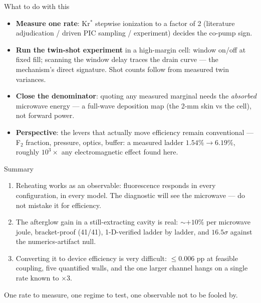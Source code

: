 \documentclass[aspectratio=169,10pt]{beamer}
\newcommand{\good}[1]{\textcolor{okgreen}{#1}}
\newcommand{\bad}[1]{\textcolor{badred}{#1}}
\begin{document}
\begin{frame}{What to do with this}
\begin{itemize}
  \item \textbf{Measure one rate}: Kr$^*$ stepwise ionization to a
        factor of 2 (literature adjudication / driven PIC sampling /
        experiment) decides the co-pump sign.
  \item \textbf{Run the twin-shot experiment} in a high-margin cell:
        window on/off at fixed fill; scanning the window delay traces
        the drain curve --- the mechanism's direct signature. Shot
        counts follow from measured twin variances.
  \item \textbf{Close the denominator}: quoting any measured marginal
        needs the \emph{absorbed} microwave energy --- a full-wave
        deposition map (the 2-mm skin vs the cell), not forward power.
  \item \textbf{Perspective}: the levers that actually move
        efficiency remain conventional --- F$_2$ fraction, pressure,
        optics, buffer: a measured ladder $1.54\%\to6.19\%$, roughly
        $10^3\times$ any electromagnetic effect found here.
\end{itemize}
\end{frame}

\begin{frame}{Summary}
\begin{enumerate}
  \item Reheating \good{works as an observable}: fluorescence responds
        in every configuration, in every model. The diagnostic will
        see the microwave --- do not mistake it for efficiency.
  \item The afterglow gain in a still-extracting cavity is
        \good{real}: ${\sim}+10\%$ per microwave joule, bracket-proof
        (41/41), 1-D-verified ladder by ladder, and
        $16.5\sigma$ against the numerics-artifact null.
  \item Converting it to device efficiency is \bad{very difficult}:
        $\le 0.006$ pp at feasible coupling, five quantified walls,
        and the one larger channel hangs on a single rate known to
        $\times3$.
\end{enumerate}
\vspace{1ex}
\centering
\alert{One rate to measure, one regime to test, one observable not to
be fooled by.}
\end{frame}
\end{document}
